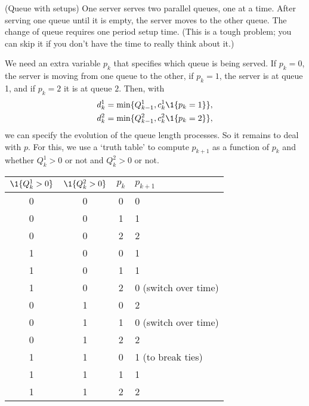 \begin{exercise}(Queue with setups)
  One server serves two parallel queues, one at a time. After serving
   one queue until it is empty,  the server moves to the other
  queue. The change of queue requires one period setup time. (This is a tough problem; you can skip it if you don't have the time to really think about it.)
  \begin{solution}
We need an extra variable $p_k$ that specifies  which queue is being served. If $p_k=0$, the server is moving from one queue to the other, if $p_k=1$, the server is at queue 1, and if $p_k=2$ it is at queue $2$. Then, with
\begin{align*}
  d^1_k &= \min\{Q^1_{k-1}, c_k^1 \1{p_k=1}\}, \\
  d^2_k &= \min\{Q^2_{k-1}, c_k^2 \1{p_k=2}\},
\end{align*}
we can specify the evolution of the queue length processes. So it remains to deal with $p$. For this, we use a `truth table' to compute $p_{k+1}$ as a function of $p_k$ and whether $Q_k^1 > 0$ or not and $Q_k^2 > 0$ or not. 

\begin{tabular}{ccc|l}
  $\1{Q^1_k > 0}$ & $\1{Q_k^2 > 0}$ & $p_k$ & $p_{k+1}$ \\ \hline
0 & 0 & 0 & 0 \\
0 & 0 & 1 & 1 \\
0 & 0 & 2 & 2 \\
1 & 0 & 0 & 1 \\
1 & 0 & 1 & 1 \\
1 & 0 & 2 & 0 (switch over time)\\
0 & 1 & 0 & 2 \\
0 & 1 & 1 & 0 (switch over time)\\
0 & 1 & 2 & 2 \\
1 & 1 & 0 & 1 (to break ties) \\
1 & 1 & 1 & 1 \\
1 & 1 & 2 & 2 \\
\end{tabular}

  \end{solution}
\end{exercise}





